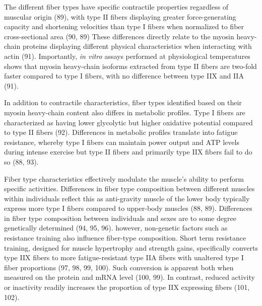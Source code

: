 \documentclass[twoside,10pt]{gihclass} %
\begin{document}
The different fiber types have specific contractile properties regardless of muscular origin
(89),
with type II fibers displaying greater force-generating capacity and shortening velocities than type I fibers when normalized to fiber cross-sectional area
(90, 89)
These differences directly relate to the myosin heavy-chain proteins displaying different physical characteristics when interacting with actin
(91).
Importantly, \emph{in vitro} assays performed at physiological temperatures shows that myosin heavy-chain isoforms extracted from type II fibers are two-fold faster compared to type I fibers, with no difference between type IIX and IIA
(91).

In addition to contractile characteristics, fiber types identified based on their myosin heavy-chain content also differs in metabolic profiles.
Type I fibers are characterized as having lower glycolytic but higher oxidative potential compared to type II fibers
(92).
Differences in metabolic profiles translate into fatigue resistance, whereby type I fibers can maintain power output and ATP levels during intense exercise but type II fibers and primarily type IIX fibers fail to do so
(88, 93).

Fiber type characteristics effectively modulate the muscle's ability to perform specific activities. Differences in fiber type composition between different muscles within individuals reflect this as anti-gravity muscle of the lower body typically express more type I fibers compared to upper-body muscles
(88, 89).
Differences in fiber type composition between individuals and sexes are to some degree genetically determined
(94, 95, 96).
however, non-genetic factors such as resistance training also influence fiber-type composition. Short term resistance training, designed for muscle hypertrophy and strength gains, specifically converts type IIX fibers to more fatigue-resistant type IIA fibers with unaltered type I fiber proportions
(97, 98, 99, 100).
Such conversion is apparent both when measured on the protein and mRNA level
(100, 99).
In contrast, reduced activity or inactivity readily increases the proportion of type IIX expressing fibers
(101, 102).
\end{document}
